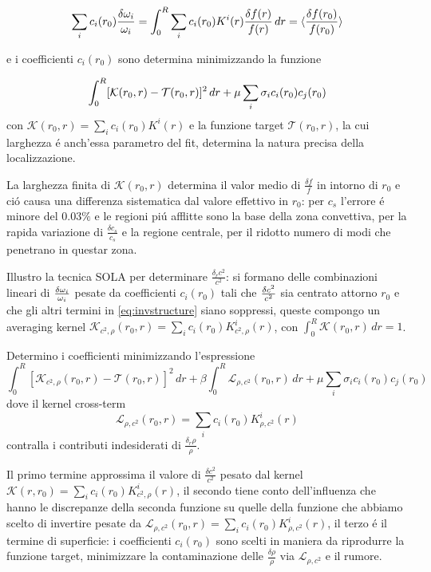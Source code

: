 {\begin{equation}\label{eq:SOLAfmean}
\sum_ic_i(r_0)\frac{\delta\omega_i}{\omega_i}=\int_0^R\sum_ic_i(r_0)K^i(r)\frac{\delta f(r)}{f(r)}\,dr=\langle \frac{\delta f(r_0)}{f(r_0)} \rangle
\end{equation}

e i coefficienti $c_i(r_0)$ sono determina minimizzando la funzione

\begin{equation}\label{eq:SOLAcir0min}
\int_0^R[\mathcal{K}(r_0,r)-\mathcal{T}(r_0,r)]^2\,dr+\mu\sum_i\sigma_ic_i(r_0)c_j(r_0)\\
\end{equation}
con $\mathcal{K}(r_0,r)=\sum_ic_i(r_0)K^i(r)$ e la funzione target $\mathcal{T}(r_0,r)$, la cui larghezza \'e anch'essa parametro del fit, determina la natura precisa della localizzazione.

La larghezza finita di $\mathcal{K}(r_0,r)$ determina il valor medio di $\frac{\delta f}{f}$ in intorno di $r_0$ e ci\'o causa una differenza sistematica  dal valore effettivo in $r_0$: per $c_s$ l'errore \'e minore del $0.03\%$ e le regioni pi\'u afflitte sono la base della zona convettiva, per la rapida variazione di $\frac{\delta c_s}{c_s}$ e la regione centrale, per il ridotto numero di modi che penetrano in questar zona.


Illustro la tecnica SOLA per determinare $\frac{\delta_rc^2}{c^2}$: si formano delle combinazioni lineari di $\frac{\delta \omega_i}{\omega_i}$ pesate da coefficienti $c_i(r_0)$ tali che $\frac{\delta c^2}{c^2}$ sia centrato attorno $r_0$ e che gli altri termini in \eqref{eq:invstructure} siano soppressi, queste compongo un averaging kernel $\mathcal{K}_{c^2,\rho}(r_0,r)=\sum_ic_i(r_0)K_{c^2,\rho}^i(r)$, con $\int_0^R\mathcal{K}(r_0,r)\,dr=1$.

Determino i coefficienti minimizzando l'espressione
\begin{equation}
\int_0^R[\mathcal{K}_{c^2,\rho}(r_0,r)-\mathcal{T}(r_0,r)]^2\,dr+\beta\int_0^R\mathcal{L}_{\rho,c^2}(r_0,r)\,dr+\mu\sum_i\sigma_ic_i(r_0)c_j(r_0)
\end{equation}
dove il kernel cross-term
\begin{equation}
\mathcal{L}_{\rho,c^2}(r_0,r)=\sum_ic_i(r_0)K_{\rho,c^2}^i(r)
\end{equation}
contralla i contributi indesiderati di $\frac{\delta_r\rho}{\rho}$.


Il primo termine approssima il valore di $\frac{\delta c^2}{c^2}$ pesato dal kernel $\mathcal{K}(r,r_0)=\sum_ic_i(r_0)K_{c^2,\rho}^i(r)$, il secondo tiene conto dell'influenza che hanno le discrepanze della seconda funzione su quelle della funzione che abbiamo scelto di invertire pesate da $\mathcal{L}_{\rho,c^2}(r_0,r)=\sum_ic_i(r_0)K_{\rho,c^2}^i(r)$, il terzo \'e il termine di superficie: i coefficienti $c_i(r_0)$ sono scelti in maniera da riprodurre la funzione target, minimizzare la contaminazione delle $\frac{\delta \rho}{\rho}$ via $\mathcal{L}_{\rho,c^2}$ e il rumore.


}
